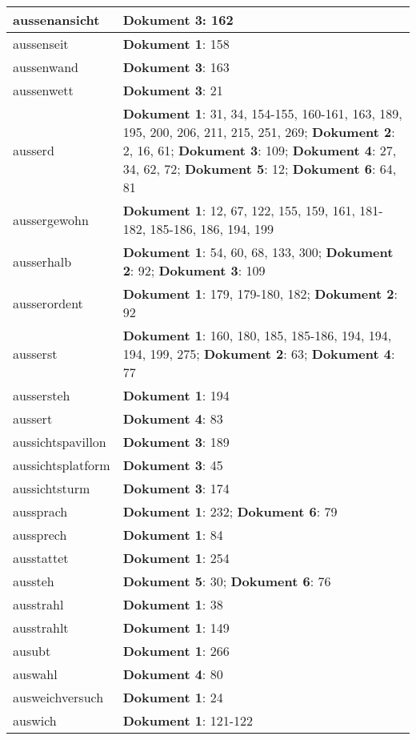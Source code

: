 \documentclass[a5paper]{article}
\begin{document}
\begin{longtable}[l]{|l|p{3in}|}
\hline
aussenansicht & \textbf{Dokument 3}: 162 \\
\hline
aussenseit & \textbf{Dokument 1}: 158 \\
\hline
aussenwand & \textbf{Dokument 3}: 163 \\
\hline
aussenwett & \textbf{Dokument 3}: 21 \\
\hline
ausserd & \textbf{Dokument 1}: 31, 34, 154-155, 160-161, 163, 189, 195, 200, 206, 211, 215, 251, 269; \textbf{Dokument 2}: 2, 16, 61; \textbf{Dokument 3}: 109; \textbf{Dokument 4}: 27, 34, 62, 72; \textbf{Dokument 5}: 12; \textbf{Dokument 6}: 64, 81 \\
\hline
aussergewohn & \textbf{Dokument 1}: 12, 67, 122, 155, 159, 161, 181-182, 185-186, 186, 194, 199 \\
\hline
ausserhalb & \textbf{Dokument 1}: 54, 60, 68, 133, 300; \textbf{Dokument 2}: 92; \textbf{Dokument 3}: 109 \\
\hline
ausserordent & \textbf{Dokument 1}: 179, 179-180, 182; \textbf{Dokument 2}: 92 \\
\hline
ausserst & \textbf{Dokument 1}: 160, 180, 185, 185-186, 194, 194, 194, 199, 275; \textbf{Dokument 2}: 63; \textbf{Dokument 4}: 77 \\
\hline
aussersteh & \textbf{Dokument 1}: 194 \\
\hline
aussert & \textbf{Dokument 4}: 83 \\
\hline
aussichtspavillon & \textbf{Dokument 3}: 189 \\
\hline
aussichtsplatform & \textbf{Dokument 3}: 45 \\
\hline
aussichtsturm & \textbf{Dokument 3}: 174 \\
\hline
aussprach & \textbf{Dokument 1}: 232; \textbf{Dokument 6}: 79 \\
\hline
aussprech & \textbf{Dokument 1}: 84 \\
\hline
ausstattet & \textbf{Dokument 1}: 254 \\
\hline
aussteh & \textbf{Dokument 5}: 30; \textbf{Dokument 6}: 76 \\
\hline
ausstrahl & \textbf{Dokument 1}: 38 \\
\hline
ausstrahlt & \textbf{Dokument 1}: 149 \\
\hline
ausubt & \textbf{Dokument 1}: 266 \\
\hline
auswahl & \textbf{Dokument 4}: 80 \\
\hline
ausweichversuch & \textbf{Dokument 1}: 24 \\
\hline
auswich & \textbf{Dokument 1}: 121-122 \\

\end{longtable}
\end{document}
